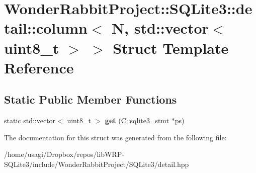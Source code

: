 \hypertarget{structWonderRabbitProject_1_1SQLite3_1_1detail_1_1column_3_01N_00_01std_1_1vector_3_01uint8__t_01_4_01_4}{\section{Wonder\-Rabbit\-Project\-:\-:S\-Q\-Lite3\-:\-:detail\-:\-:column$<$ N, std\-:\-:vector$<$ uint8\-\_\-t $>$ $>$ Struct Template Reference}
\label{structWonderRabbitProject_1_1SQLite3_1_1detail_1_1column_3_01N_00_01std_1_1vector_3_01uint8__t_01_4_01_4}
}
\subsection*{Static Public Member Functions}
\begin{DoxyCompactItemize}
\item 
\hypertarget{structWonderRabbitProject_1_1SQLite3_1_1detail_1_1column_3_01N_00_01std_1_1vector_3_01uint8__t_01_4_01_4_a37593f1dd3755db190ca57c514c4a2e5}{static std\-::vector$<$ uint8\-\_\-t $>$ {\bfseries get} (C\-::sqlite3\-\_\-stmt $\ast$ps)}\label{structWonderRabbitProject_1_1SQLite3_1_1detail_1_1column_3_01N_00_01std_1_1vector_3_01uint8__t_01_4_01_4_a37593f1dd3755db190ca57c514c4a2e5}

\end{DoxyCompactItemize}


The documentation for this struct was generated from the following file\-:\begin{DoxyCompactItemize}
\item 
/home/usagi/\-Dropbox/repos/lib\-W\-R\-P-\/\-S\-Q\-Lite3/include/\-Wonder\-Rabbit\-Project/\-S\-Q\-Lite3/detail.\-hpp\end{DoxyCompactItemize}
